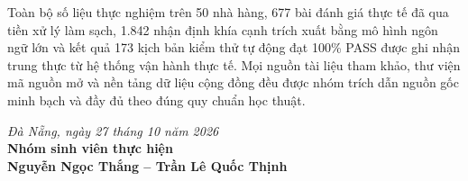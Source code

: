 \documentclass[12pt, a4paper]{article}
\begin{document}
Toàn bộ số liệu thực nghiệm trên 50 nhà hàng, 677 bài đánh giá thực tế đã qua tiền xử lý làm sạch, 1.842 nhận định khía cạnh trích xuất bằng mô hình ngôn ngữ lớn và kết quả 173 kịch bản kiểm thử tự động đạt 100\% PASS được ghi nhận trung thực từ hệ thống vận hành thực tế. Mọi nguồn tài liệu tham khảo, thư viện mã nguồn mở và nền tảng dữ liệu cộng đồng đều được nhóm trích dẫn nguồn gốc minh bạch và đầy đủ theo đúng quy chuẩn học thuật.

\vspace{1.2cm}
\begin{flushright}
\textit{Đà Nẵng, ngày 27 tháng 10 năm 2026}\\
\textbf{Nhóm sinh viên thực hiện}\\[1.2cm]
\textbf{Nguyễn Ngọc Thắng -- Trần Lê Quốc Thịnh}
\end{flushright}

\newpage
\end{document}
